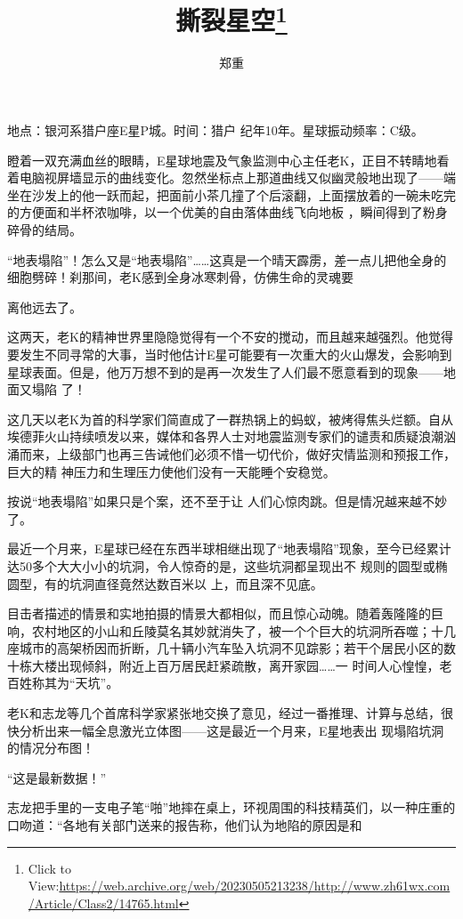 \documentclass{article}
\title{撕裂星空\footnote{Click to View:\url{https://web.archive.org/web/20230505213238/http://www.zh61wx.com/Article/Class2/14765.html}}}
\author{郑重}
\date{}
\begin{document}

\maketitle


\Large

﻿地点：银河系猎户座E星P城。时间：猎户
纪年10年。星球振动频率：C级。 

瞪着一双充满血丝的眼睛，E星球地震及气象监测中心主任老K，正目不转睛地看着电脑视屏墙显示的曲线变化。忽然坐标点上那道曲线又似幽灵般地出现了——端坐在沙发上的他一跃而起，把面前小茶几撞了个后滚翻，上面摆放着的一碗未吃完的方便面和半杯浓咖啡，以一个优美的自由落体曲线飞向地板
，瞬间得到了粉身碎骨的结局。 

“地表塌陷”！怎么又是“地表塌陷”……这真是一个晴天霹雳，差一点儿把他全身的细胞劈碎！刹那间，老K感到全身冰寒刺骨，仿佛生命的灵魂要

\newpage
离他远去了。 

这两天，老K的精神世界里隐隐觉得有一个不安的搅动，而且越来越强烈。他觉得要发生不同寻常的大事，当时他估计E星可能要有一次重大的火山爆发，会影响到星球表面。但是，他万万想不到的是再一次发生了人们最不愿意看到的现象——地面又塌陷
了！ 

这几天以老K为首的科学家们简直成了一群热锅上的蚂蚁，被烤得焦头烂额。自从埃德菲火山持续喷发以来，媒体和各界人士对地震监测专家们的谴责和质疑浪潮汹涌而来，上级部门也再三告诫他们必须不惜一切代价，做好灾情监测和预报工作，巨大的精
神压力和生理压力使他们没有一天能睡个安稳觉。 

按说“地表塌陷”如果只是个案，还不至于让
人们心惊肉跳。但是情况越来越不妙了。 

最近一个月来，E星球已经在东西半球相继出现了“地表塌陷”现象，至今已经累计达50多个大大小小的坑洞，令人惊奇的是，这些坑洞都呈现出不
\newpage
规则的圆型或椭圆型，有的坑洞直径竟然达数百米以
上，而且深不见底。 

目击者描述的情景和实地拍摄的情景大都相似，而且惊心动魄。随着轰隆隆的巨响，农村地区的小山和丘陵莫名其妙就消失了，被一个个巨大的坑洞所吞噬；十几座城市的高架桥因而折断，几十辆小汽车坠入坑洞不见踪影；若干个居民小区的数十栋大楼出现倾斜，附近上百万居民赶紧疏散，离开家园……一
时间人心惶惶，老百姓称其为“天坑”。 

老K和志龙等几个首席科学家紧张地交换了意见，经过一番推理、计算与总结，很快分析出来一幅全息激光立体图——这是最近一个月来，E星地表出
现塌陷坑洞的情况分布图！ 


“这是最新数据！” 

志龙把手里的一支电子笔“啪”地摔在桌上，环视周围的科技精英们，以一种庄重的口吻道：“各地有关部门送来的报告称，他们认为地陷的原因是和
\newpage
\end{document}
